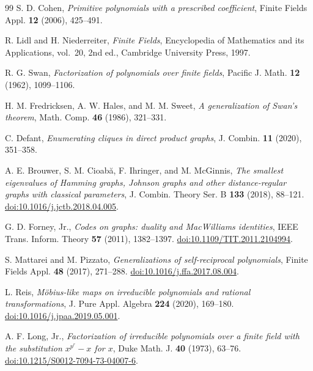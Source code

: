 \documentclass[11pt]{article}
\theoremstyle{definition}
\theoremstyle{remark}
\begin{document}
\begin{thebibliography}{99}
\small
\setlength{\itemsep}{1.5pt}
\setlength{\parsep}{0pt}
\setlength{\parskip}{0pt}
S. D. Cohen,
\emph{Primitive polynomials with a prescribed coefficient},
Finite Fields Appl. \textbf{12} (2006), 425--491.

R. Lidl and H. Niederreiter,
\emph{Finite Fields},
Encyclopedia of Mathematics and its Applications, vol.~20, 2nd ed., Cambridge University Press, 1997.

R. G. Swan,
\emph{Factorization of polynomials over finite fields},
Pacific J. Math. \textbf{12} (1962), 1099--1106.

H. M. Fredricksen, A. W. Hales, and M. M. Sweet,
\emph{A generalization of Swan's theorem},
Math. Comp. \textbf{46} (1986), 321--331.

C. Defant,
\emph{Enumerating cliques in direct product graphs},
J. Combin. \textbf{11} (2020), 351--358.

A. E. Brouwer, S. M. Cioab\u{a}, F. Ihringer, and M. McGinnis,
\emph{The smallest eigenvalues of Hamming graphs, Johnson graphs and
other distance-regular graphs with classical parameters},
J. Combin. Theory Ser. B \textbf{133} (2018), 88--121.
\href{https://doi.org/10.1016/j.jctb.2018.04.005}{doi:10.1016/j.jctb.2018.04.005}.

G. D. Forney, Jr.,
\emph{Codes on graphs: duality and MacWilliams identities},
IEEE Trans. Inform. Theory \textbf{57} (2011), 1382--1397.
\href{https://doi.org/10.1109/TIT.2011.2104994}{doi:10.1109/TIT.2011.2104994}.

S. Mattarei and M. Pizzato,
\emph{Generalizations of self-reciprocal polynomials},
Finite Fields Appl. \textbf{48} (2017), 271--288.
\href{https://doi.org/10.1016/j.ffa.2017.08.004}{doi:10.1016/j.ffa.2017.08.004}.

L. Reis,
\emph{M\"obius-like maps on irreducible polynomials and rational transformations},
J. Pure Appl. Algebra \textbf{224} (2020), 169--180.
\href{https://doi.org/10.1016/j.jpaa.2019.05.001}{doi:10.1016/j.jpaa.2019.05.001}.

A. F. Long, Jr.,
\emph{Factorization of irreducible polynomials over a finite field with
the substitution $x^{p^r}-x$ for $x$},
Duke Math. J. \textbf{40} (1973), 63--76.
\href{https://doi.org/10.1215/S0012-7094-73-04007-6}{doi:10.1215/S0012-7094-73-04007-6}.


\end{thebibliography}
\end{document}
